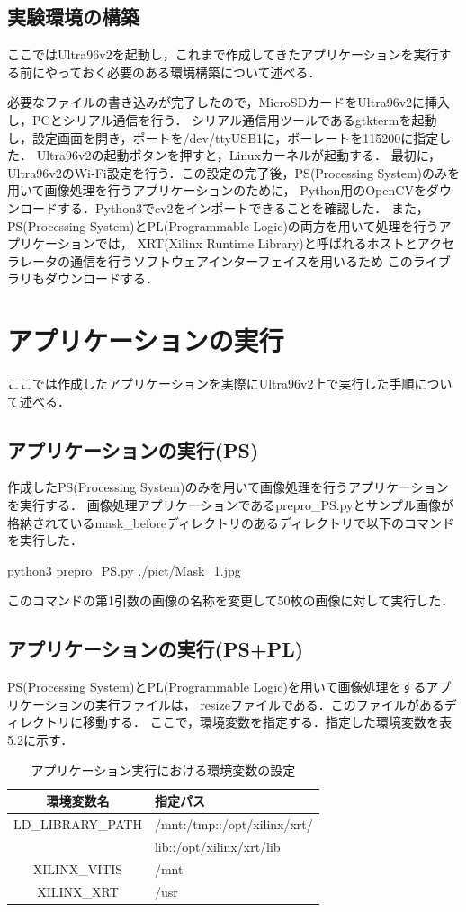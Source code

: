 \documentclass[11pt,a4j]{jreport}
\begin{document}
\subsection{実験環境の構築}
ここではUltra96v2を起動し，これまで作成してきたアプリケーションを実行する前にやっておく必要のある環境構築について述べる．

必要なファイルの書き込みが完了したので，MicroSDカードをUltra96v2に挿入し，PCとシリアル通信を行う．
シリアル通信用ツールであるgtktermを起動し，設定画面を開き，ポートを/dev/ttyUSB1に，ボーレートを115200に指定した．
Ultra96v2の起動ボタンを押すと，Linuxカーネルが起動する．
最初に，Ultra96v2のWi-Fi設定を行う．この設定の完了後，PS(Processing System)のみを用いて画像処理を行うアプリケーションのために，
Python用のOpenCVをダウンロードする．Python3でcv2をインポートできることを確認した．
また，PS(Processing System)とPL(Programmable Logic)の両方を用いて処理を行うアプリケーションでは，
XRT(Xilinx Runtime Library)と呼ばれるホストとアクセラレータの通信を行うソフトウェアインターフェイスを用いるため
このライブラリもダウンロードする．

\section{アプリケーションの実行}
ここでは作成したアプリケーションを実際にUltra96v2上で実行した手順について述べる．
\subsection{アプリケーションの実行(PS)}
作成したPS(Processing System)のみを用いて画像処理を行うアプリケーションを実行する．
画像処理アプリケーションであるprepro_PS.pyとサンプル画像が格納されているmask_beforeディレクトリのあるディレクトリで以下のコマンドを実行した．

python3 prepro_PS.py ./pict/Mask_1.jpg

このコマンドの第1引数の画像の名称を変更して50枚の画像に対して実行した．

\subsection{アプリケーションの実行(PS+PL)}
PS(Processing System)とPL(Programmable Logic)を用いて画像処理をするアプリケーションの実行ファイルは，
resizeファイルである．このファイルがあるディレクトリに移動する．
ここで，環境変数を指定する．指定した環境変数を表5.2に示す．
\begin{table}[H]
  \caption{アプリケーション実行における環境変数の設定}
  \centering
  \begin{tabular}{|c|l|}
    \hline
    環境変数名 & 指定パス \\
    \hline \hline
    LD_LIBRARY_PATH & /mnt:/tmp::/opt/xilinx/xrt/ \\
    & lib::/opt/xilinx/xrt/lib \\
    \hline
    XILINX_VITIS & /mnt \\
    \hline
    XILINX_XRT & /usr \\
    \hline
    \end{tabular}
\end{table}
\end{document}
